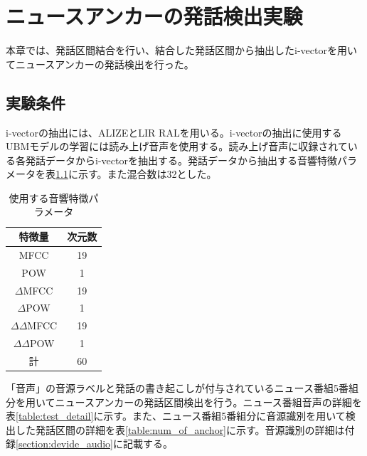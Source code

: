 \chapter{ニュースアンカーの発話検出実験}
\label{chapter:get_anchor}
本章では、発話区間結合を行い、結合した発話区間から抽出したi-vectorを用いてニュースアンカーの発話検出を行った。

\section{実験条件}
i-vectorの抽出には、ALIZEとLIR RAL\cite{alize}を用いる。i-vectorの抽出に使用するUBMモデルの学習には読み上げ音声\cite{ATR}を使用する。読み上げ音声に収録されている各発話データからi-vectorを抽出する。発話データから抽出する音響特徴パラメータを表\ref{iv_feature2}に示す。また混合数は32とした。\par

\begin{table}[H]
  \begin{center}
    \caption{使用する音響特徴パラメータ \label{iv_feature2}}
    \begin{tabular}{|c||c|} \hline
      特徴量 & 次元数\\ \hline
      MFCC & 19  \\ 
      POW & 1  \\ 
      $\Delta$MFCC & 19 \\ 
      $\Delta$POW & 1 \\ 
      $\Delta\Delta$MFCC & 19 \\ 
      $\Delta\Delta$POW & 1 \\ \hline
      計 & 60 \\ \hline
    \end{tabular}
  \end{center}
\end{table}

\vspace{0.2in}\par
「音声」の音源ラベルと発話の書き起こしが付与されているニュース番組5番組分を用いてニュースアンカーの発話区間検出を行う。ニュース番組音声の詳細を表\ref{table:test_detail}に示す。また、ニュース番組5番組分に音源識別を用いて検出した発話区間の詳細を表\ref{table:num_of_anchor}に示す。音源識別の詳細は付録\ref{section:devide_audio}に記載する。

